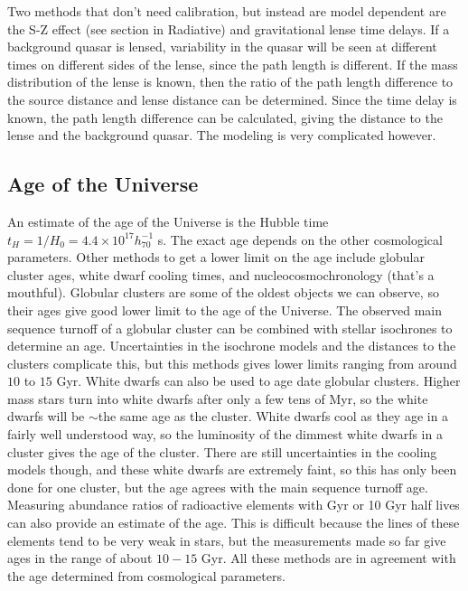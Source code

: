 Two methods that don't need calibration, but instead are model dependent 
are the S-Z effect (see section in Radiative) and gravitational lense 
time delays.  If a background quasar is lensed, variability in the quasar 
will be seen at different times on different sides of the lense, since the 
path length is different.  If the mass distribution of the lense is known, 
then the ratio of the path length difference to the source distance and lense 
distance can be determined.  Since the time delay is known, the path length 
difference can be calculated, giving the distance to the lense and the 
background quasar.  The modeling is very complicated however.  

\subsection{Age of the Universe}
An estimate of the age of the Universe is the Hubble time 
$t_H=1/H_0=4.4\times10^{17}h_{70}^{-1}$ s.  The exact age depends on the other 
cosmological parameters.  Other methods to get a lower limit on the age include 
globular cluster ages, white dwarf cooling times, and nucleocosmochronology 
(that's a mouthful).  Globular clusters are some of the oldest objects 
we can observe, so their ages give good lower limit to the age of the 
Universe.  The observed main sequence turnoff of a globular cluster can be 
combined with stellar isochrones to determine an age.  Uncertainties in 
the isochrone models and the distances to the clusters complicate this, 
but this methods gives lower limits ranging from around $10$ to $15$ Gyr.  
White dwarfs can also be used to age date globular clusters.  Higher 
mass stars turn into white dwarfs after only a few tens of Myr, so the 
white dwarfs will be $\sim$the same age as the cluster.  White dwarfs cool 
as they age in a fairly well understood way, so the luminosity of the 
dimmest white dwarfs in a cluster gives the age of the cluster.  There are 
still uncertainties in the cooling models though, and these white dwarfs are 
extremely faint, so this has only been done for one cluster, but the age 
agrees with the main sequence turnoff age.  Measuring abundance ratios of 
radioactive elements with Gyr or 10 Gyr half lives can also provide an estimate 
of the age.  This is difficult because the lines of these elements tend to be 
very weak in stars, but the measurements made so far give ages in the range of 
about $10-15$ Gyr.  All these methods are in agreement with the age determined 
from cosmological parameters.  

